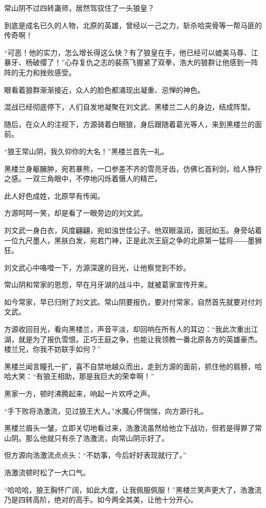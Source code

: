 \begin{this_body}
常山阴不过四转蛊师，居然驾驭住了一头狼皇？

到底是成名已久的人物，北原的英雄，曾经以一己之力，斩杀哈突骨等一帮马匪的传奇啊！

“可恶！他的实力，怎么增长得这么快？有了狼皇在手，他已经可以媲美马尊、江暴牙、杨破缨了！”心存复仇之志的裴燕飞握紧了双拳，浩大的狼群让他感到一阵阵的无力和挫败感受。

眼看着狼群渐渐接近，众人的脸色都涌现出凝重、忌惮的神色。

混战已经彻底停下，人们自发地凝聚在刘文武、黑楼兰二人的身边，结成阵型。

随后，在众人的注视下，方源骑着白眼狼，身后跟随着葛光等人，来到黑楼兰的面前。

“狼王常山阴，我久仰你的大名！”黑楼兰首先一礼。

黑楼兰身躯臃肿，宛若暴熊，一口参差不齐的雪亮牙齿，仿佛匕首利剑，给人狰狞之感。一双三角眼中，不停地闪烁着慑人的精芒。

此人好色成姓，北原早有传闻。

方源呵呵一笑，却是看了一眼旁边的刘文武。

刘文武一身白衣，风度翩翩，宛如浊世佳公子。他双眼温润，面冠如玉。身旁站着一位九尺墨人，黑肤白发，宛若门神，正是此次王庭之争的北原第一猛将――墨狮狂。

刘文武心中咯噔一下，方源深邃的目光，让他察觉到不妙。

常山阴和常家的恩怨，早在月牙湖的战斗中，就被葛家宣传开来。

如今常家，早已归附了刘文武。常山阴要报仇，要对付常家，自然首先就要对付刘文武。

方源收回目光，看向黑楼兰，声音平淡，却回响在所有人的耳边：“我此次重出江湖，就是为了报仇雪恨。正巧王庭之争，也能让我领教一番北原各方的英雄豪杰。楼兰兄，你我不妨联手如何？”

黑楼兰闻言瞳孔一扩，喜不自禁地越众而出，走到方源的面前，抓住他的肩膀，哈哈大笑：“有狼王相助，那是我巨大的荣幸啊！”

黑家一方，顿时沸腾起来，响起一片欢呼之声。

“手下败将浩激流，见过狼王大人。”水魔心怀惴惴，向方源行礼。

黑楼兰眉头一皱，立即关切地看过来，浩激流虽然给他立下战功，但若是得罪了常山阴。那么他就只有杀了浩激流，向常山阴示好了。

但方源向浩激流点点头：“不妨事，今后好好表现就行了。”

浩激流顿时松了一大口气。

“哈哈哈，狼王胸怀广阔，如此大度，让我佩服佩服！”黑楼兰笑声更大了，浩激流乃是四转高阶，绝对的高手。如今两全其美，让他十分开心。


\end{this_body}
